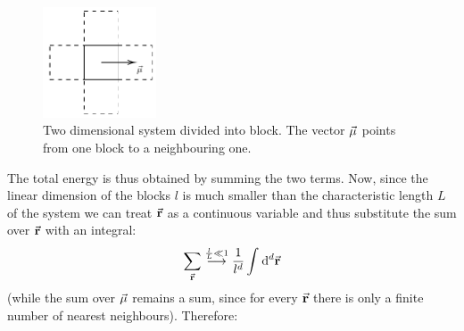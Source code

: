 \documentclass[../../Main/Main.tex]{subfiles}
\begin{document}
\begin{itemize}
\begin{figure}[H]
\centering
\includegraphics[width=0.3\textwidth]{./img/2.pdf}
\caption{\label{fig:17_2} Two dimensional system divided into block. The vector \( \va{\mu } \) points  from one block to a neighbouring one.}
\end{figure}

\end{itemize}

The total energy is thus obtained by summing the two terms. Now, since the linear dimension of the blocks \( l \)  is much smaller than the characteristic length \( L \) of the system we can treat \( \va{r} \)  as a continuous variable and thus substitute the sum over  \( \va{r} \) with an integral:
\begin{equation*}
  \sum_{\va{r}}^{}  \overset{\frac{l}{L} \ll 1}{\longrightarrow}   \frac{1}{l^d} \int_{}^{} \dd[d]{\va{r}}
\end{equation*}
(while the sum over \( \va{\mu } \) remains a sum, since for every \( \va{r} \)  there is only a finite number of nearest neighbours). Therefore:
\end{document}
